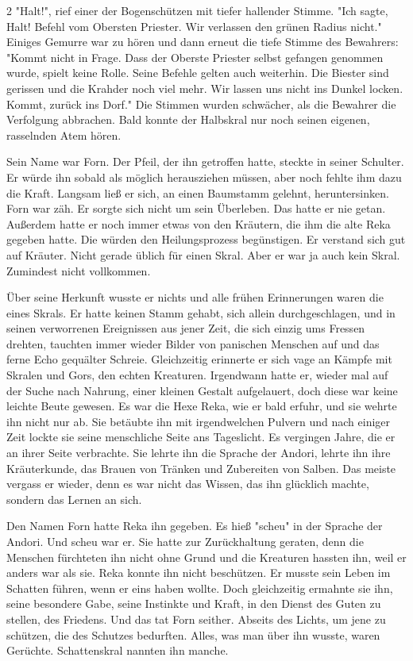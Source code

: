 \documentclass[10pt, a4paper, oneside]{book}
\begin{document}
\begin{multicols}{2}
"Halt!", rief einer der Bogenschützen mit tiefer hallender Stimme. "Ich sagte, Halt! Befehl vom Obersten Priester. Wir verlassen den grünen Radius nicht." Einiges Gemurre war zu hören und dann erneut die tiefe Stimme des Bewahrers: "Kommt nicht in Frage. Dass der Oberste Priester selbst gefangen genommen wurde, spielt keine Rolle. Seine Befehle gelten auch weiterhin. Die Biester sind gerissen und die Krahder noch viel mehr. Wir lassen uns nicht ins Dunkel locken. Kommt, zurück ins Dorf." Die Stimmen wurden schwächer, als die Bewahrer die Verfolgung abbrachen. Bald konnte der Halbskral nur noch seinen eigenen, rasselnden Atem hören. 

Sein Name war Forn. Der Pfeil, der ihn getroffen hatte, steckte in seiner Schulter. Er würde ihn sobald als möglich herausziehen müssen, aber noch fehlte ihm dazu die Kraft. Langsam ließ er sich, an einen Baumstamm gelehnt, heruntersinken. Forn war zäh. Er sorgte sich nicht um sein Überleben. Das hatte er nie getan. Außerdem hatte er noch immer etwas von den Kräutern, die ihm die alte Reka gegeben hatte. Die würden den Heilungsprozess begünstigen. Er verstand sich gut auf Kräuter. Nicht gerade üblich für einen Skral. Aber er war ja auch kein Skral. Zumindest nicht vollkommen. 

Über seine Herkunft wusste er nichts und alle frühen Erinnerungen waren die eines Skrals. Er hatte keinen Stamm gehabt, sich allein durchgeschlagen, und in seinen verworrenen Ereignissen aus jener Zeit, die sich einzig ums Fressen drehten, tauchten immer wieder Bilder von panischen Menschen auf und das ferne Echo gequälter Schreie. Gleichzeitig erinnerte er sich vage an Kämpfe mit Skralen und Gors, den echten Kreaturen. Irgendwann hatte er, wieder mal auf der Suche nach Nahrung, einer kleinen Gestalt aufgelauert, doch diese war keine leichte Beute gewesen. Es war die Hexe Reka, wie er bald erfuhr, und sie wehrte ihn nicht nur ab. Sie betäubte ihn mit irgendwelchen Pulvern und nach einiger Zeit lockte sie seine menschliche Seite ans Tageslicht. Es vergingen Jahre, die er an ihrer Seite verbrachte. Sie lehrte ihn die Sprache der Andori, lehrte ihn ihre Kräuterkunde, das Brauen von Tränken und Zubereiten von Salben. Das meiste vergass er wieder, denn es war nicht das Wissen, das ihn glücklich machte, sondern das Lernen an sich. 

Den Namen Forn hatte Reka ihn gegeben. Es hieß "scheu" in der Sprache der Andori. Und scheu war er. Sie hatte zur Zurückhaltung geraten, denn die Menschen fürchteten ihn nicht ohne Grund und die Kreaturen hassten ihn, weil er anders war als sie. Reka konnte ihn nicht beschützen. Er musste sein Leben im Schatten führen, wenn er eins haben wollte. Doch gleichzeitig ermahnte sie ihn, seine besondere Gabe, seine Instinkte und Kraft, in den Dienst des Guten zu stellen, des Friedens. Und das tat Forn seither. Abseits des Lichts, um jene zu schützen, die des Schutzes bedurften. Alles, was man über ihn wusste, waren Gerüchte. Schattenskral nannten ihn manche. 


\end{multicols}
\end{document}
